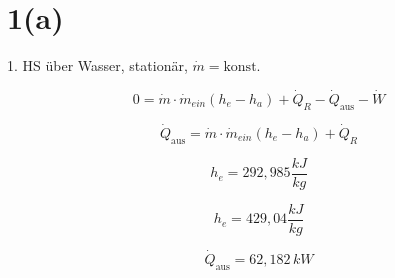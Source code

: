 \section*{1(a)}

1. HS über Wasser, stationär, \( \dot{m} = \text{konst.} \)

\[
0 = \dot{m} \cdot \dot{m}_{ein} (h_e - h_a) + \dot{Q}_R - \dot{Q}_{\text{aus}} - \dot{W}
\]

\[
\dot{Q}_{\text{aus}} = \dot{m} \cdot \dot{m}_{ein} (h_e - h_a) + \dot{Q}_R
\]

\[
h_e = 292,985 \frac{kJ}{kg}
\]

\[
h_e = 429,04 \frac{kJ}{kg}
\]

\[
\dot{Q}_{\text{aus}} = 62,182 \, kW
\]